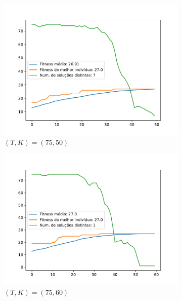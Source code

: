 \documentclass[11pt,a4paper]{article}
\begin{document}
\begin{figure}[!hb]
	\begin{subfigure}[b]{0.33\textwidth}
		\centering
		\includegraphics[width=\textwidth]{teste6_75_50.pdf}
		\caption{$(T,K)=(75,50)$}
	\end{subfigure}%
	\begin{subfigure}[b]{0.33\textwidth}
		\centering
		\includegraphics[width=\textwidth]{teste6_75_60.pdf}
		\caption{$(T,K)=(75,60)$}
	\end{subfigure}%
		\begin{subfigure}[b]{0.33\textwidth}
		\centering

\end{subfigure}
\end{figure}
\end{document}
